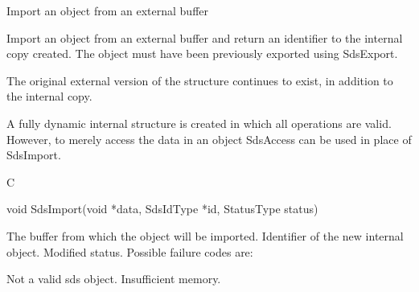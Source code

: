 \begin{manroutinedescription}
      Import an object from an external buffer

      Import an object from an external buffer and return an identifier
      to the internal copy created. The object must have
      been previously exported using SdsExport.

      The original external version of the
      structure continues to exist, in addition to the internal copy.

      A fully dynamic internal structure is created in which all {}
      operations are valid. However, to merely access the data in an object
      SdsAccess can be used in place of SdsImport.

      C

      void SdsImport(void *data, SdsIdType *id, StatusType {\mantt{*}} {} status)
 
\begin{manparametertable}
 The buffer from which the object %
will be
                          imported.
  Identifier of the new %
internal object.
 Modified status. Possible %
failure codes are:
\end{manparametertable}
\begin{mantwocolumntable}
Not a valid sds object.
Insufficient memory.
\end{mantwocolumntable}
\end{manroutinedescription}

